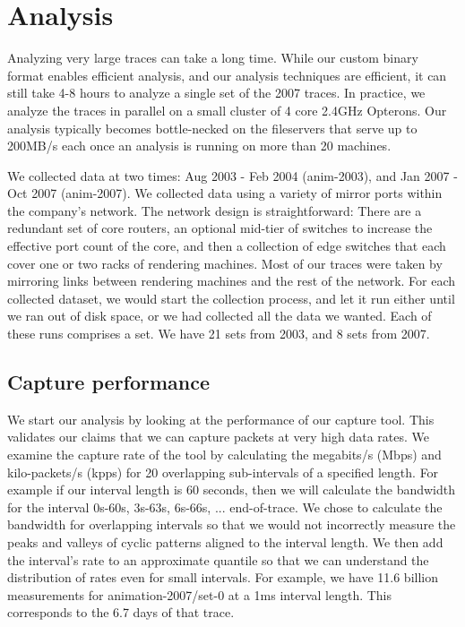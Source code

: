 \section{Analysis}
\label{sec:analysis}

Analyzing very large traces can take a long time.  While our custom
binary format enables efficient analysis, and our analysis techniques
are efficient, it can still take 4-8 hours to analyze a single set of
the 2007 traces.  In practice, we analyze the traces in parallel on a
small cluster of 4 core 2.4GHz Opterons.  Our analysis typically
becomes bottle-necked on the fileservers that serve up to 200MB/s each
once an analysis is running on more than 20 machines.

We collected data at two times: Aug 2003 - Feb 2004 (anim-2003), and Jan 2007 - Oct 2007
(anim-2007).  We collected data using a variety of mirror
ports within the company's network.
The network design is
straightforward: There are a redundant set of core routers, an
optional mid-tier of switches to increase the effective port count of
the core, and then a collection of edge switches that each cover one
or two racks of rendering machines.  Most of our traces were taken by
mirroring links between rendering machines and the rest of the network.
For each collected dataset, we would start the collection
process, and let it run either until we ran out of disk space, or we
had collected all the data we wanted.  Each of these runs comprises a
set.  We have 21 sets from 2003, and 8 sets from 2007.

\subsection{Capture performance}

We start our analysis by looking at the performance of our capture
tool.  This validates our claims that we can capture packets at very
high data rates.  We examine the capture rate of the tool by
calculating the megabits/s (Mbps) and kilo-packets/s (kpps) for
20 overlapping sub-intervals of a specified length.  For example if our
interval length is 60 seconds, then we will calculate the bandwidth
for the interval 0s-60s, 3s-63s, 6s-66s, ... end-of-trace.  We chose
to calculate the bandwidth for overlapping intervals so that we would not
incorrectly measure the peaks and valleys of cyclic patterns aligned to the interval length.
We then add the
interval's rate to an approximate quantile so that we can understand
the distribution of rates even for small intervals.  For example, we
have 11.6 billion measurements for animation-2007/set-0 at a 1ms interval
length.  This corresponds to the 6.7 days of that trace.

